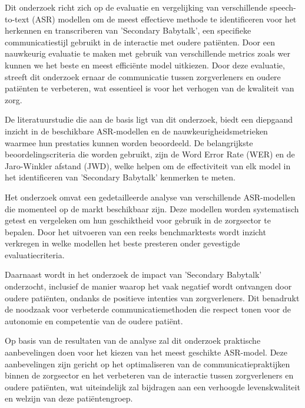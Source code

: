 Dit onderzoek richt zich op de evaluatie en vergelijking van verschillende speech-to-text (ASR) modellen om de meest effectieve methode te identificeren voor het herkennen en transcriberen van 'Secondary Babytalk', een specifieke communicatiestijl gebruikt in de interactie met oudere patiënten. Door een nauwkeurig evaluatie te maken met gebruik van verschillende metrics zoals \gls{wer} kunnen we het beste en meest efficiënte model uitkiezen. Door deze evaluatie, streeft dit  onderzoek ernaar de communicatie tussen zorgverleners en oudere patiënten te verbeteren, wat essentieel is voor het verhogen van de kwaliteit van zorg.

De literatuurstudie die aan de basis ligt van dit onderzoek, biedt een diepgaand inzicht in de beschikbare ASR-modellen en de nauwkeurigheidsmetrieken waarmee hun prestaties kunnen worden beoordeeld. De belangrijkste beoordelingscriteria die worden gebruikt, zijn de Word Error Rate (WER) en de Jaro-Winkler afstand (JWD), welke helpen om de effectiviteit van elk model in het identificeren van 'Secondary Babytalk' kenmerken te meten.

Het onderzoek omvat een gedetailleerde analyse van verschillende ASR-modellen die momenteel op de markt beschikbaar zijn. Deze modellen worden systematisch getest en vergeleken om hun geschiktheid voor gebruik in de zorgsector te bepalen. Door het uitvoeren van een reeks benchmarktests wordt inzicht verkregen in welke modellen het beste presteren onder gevestigde evaluatiecriteria.

Daarnaast wordt in het onderzoek de impact van 'Secondary Babytalk' onderzocht, inclusief de manier waarop het vaak negatief wordt ontvangen door oudere patiënten, ondanks de positieve intenties van zorgverleners. Dit benadrukt de noodzaak voor verbeterde communicatiemethoden die respect tonen voor de autonomie en competentie van de oudere patiënt.

Op basis van de resultaten van de analyse zal dit onderzoek praktische aanbevelingen doen voor het kiezen van het meest geschikte ASR-model. Deze aanbevelingen zijn gericht op het optimaliseren van de communicatiepraktijken binnen de zorgsector en het verbeteren van de interactie tussen zorgverleners en oudere patiënten, wat uiteindelijk zal bijdragen aan een verhoogde levenskwaliteit en welzijn van deze patiëntengroep.
